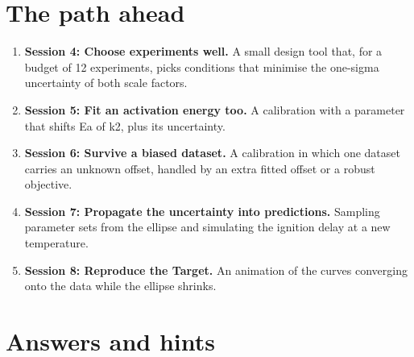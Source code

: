 \documentclass[11pt,a4paper]{article}
\begin{document}
\section{The path ahead}
\begin{enumerate}[nosep]
\item \textbf{Session 4: Choose experiments well.} A small design tool that, for a budget of 12 experiments, picks conditions that minimise the one-sigma uncertainty of both scale factors.
\item \textbf{Session 5: Fit an activation energy too.} A calibration with a parameter that shifts Ea of k2, plus its uncertainty.
\item \textbf{Session 6: Survive a biased dataset.} A calibration in which one dataset carries an unknown offset, handled by an extra fitted offset or a robust objective.
\item \textbf{Session 7: Propagate the uncertainty into predictions.} Sampling parameter sets from the ellipse and simulating the ignition delay at a new temperature.
\item \textbf{Session 8: Reproduce the Target.} An animation of the curves converging onto the data while the ellipse shrinks.
\end{enumerate}

\section{Answers and hints}
\end{document}
